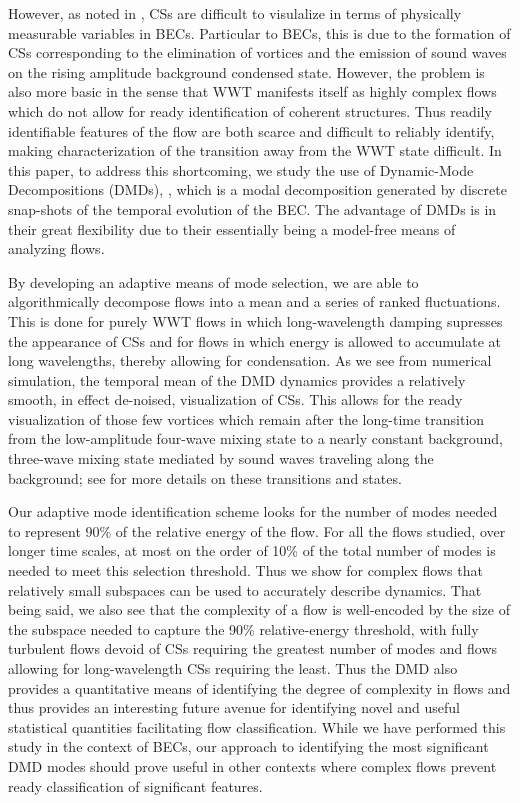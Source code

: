 \documentclass[aps,prl,preprint,groupedaddress]{revtex4-1}
\begin{document}
However, as noted in \cite{nazarenko2}, CSs are difficult to visulalize in terms of physically measurable variables in BECs.  Particular to BECs, this is due to the formation of CSs corresponding to the elimination of vortices and the emission of sound waves on the rising amplitude background condensed state.  However, the problem is also more basic in the sense that WWT manifests itself as highly complex flows which do not allow for ready identification of coherent structures.  Thus readily identifiable features of the flow are both scarce and difficult to reliably identify, making characterization of the transition away from the WWT state difficult.  In this paper, to address this shortcoming, we study the use of Dynamic-Mode Decompositions (DMDs), \cite{mezic1,schmid,williams,kutz}, which is a modal decomposition generated by discrete snap-shots of the temporal evolution of the BEC.  The advantage of DMDs is in their great flexibility due to their essentially being a model-free means of analyzing flows.  

By developing an adaptive means of mode selection, we are able to algorithmically decompose flows into a mean and a series of ranked fluctuations.  This is done for purely WWT flows in which long-wavelength damping supresses the appearance of CSs and for flows in which energy is allowed to accumulate at long wavelengths, thereby allowing for condensation.  As we see from numerical simulation, the temporal mean of the DMD dynamics provides a relatively smooth, in effect de-noised, visualization of CSs.  This allows for the ready visualization of those few vortices which remain after the long-time transition from the low-amplitude four-wave mixing state to a nearly constant background, three-wave mixing state mediated by sound waves traveling along the background; see \cite{nazarenko,nazarenko2,pethick} for more details on these transitions and states.  

Our adaptive mode identification scheme looks for the number of modes needed to represent 90\% of the relative energy of the flow.  For all the flows studied, over longer time scales, at most on the order of 10\% of the total number of modes is needed to meet this selection threshold.  Thus we show for complex flows that relatively small subspaces can be used to accurately describe dynamics.  That being said, we also see that the complexity of a flow is well-encoded by the size of the subspace needed to capture the 90\% relative-energy threshold, with fully turbulent flows devoid of CSs requiring the greatest number of modes and flows allowing for long-wavelength CSs requiring the least.  Thus the DMD also provides a quantitative means of identifying the degree of complexity in flows and thus provides an interesting future avenue for identifying novel and useful statistical quantities facilitating flow classification.  While we have performed this study in the context of BECs, our approach to identifying the most significant DMD modes should prove useful in other contexts where complex flows prevent ready classification of significant features.  
\end{document}
